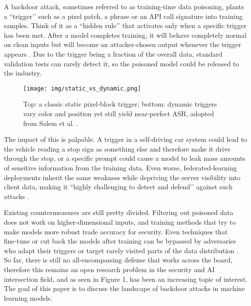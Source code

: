 \documentclass[sigconf,authorversion,nonacm,balance=false]{acmart}
\begin{document}
A backdoor attack, sometimes referred to as training‑time data poisoning, plants a “trigger’’ such as a pixel patch, a phrase or an API call signature into training samples. Think of it as a “hidden rule’’ that activates only when a specific trigger has been met. After a model completes training, it will behave completely normal on clean inputs but will become an attacker‑chosen output whenever the trigger appears \cite{attack_defense_wang_2023,background_attack_defense_goldblum_2023}. Due to the trigger being a fraction of the overall data, standard validation tests can rarely detect it, so the poisoned model could be released to the industry.

\begin{figure}[t]
  \centering
  \texttt{[image: img/static\_vs\_dynamic.png]}%
  \caption{Top: a classic static pixel‑block trigger; bottom: dynamic triggers vary color and position yet still yield near‑perfect ASR, adopted from Salem et al. \cite{attack_salem_2022}.}
  \label{fig:staticdynamic}
\end{figure}

The impact of this is palpable. A trigger in a self‑driving car system could lead to the vehicle reading a stop sign as something else and therefore make it drive through the stop, or a specific prompt could cause a model to leak mass amounts of sensitive information from the training data. Even worse, federated‑learning deployments inherit the same weakness while depriving the server visibility into client data, making it “highly challenging to detect and defend’’ against such attacks \cite{attack_salem_2022,casestudy_defense_gill_2023}.

Existing countermeasures are still pretty divided. Filtering out poisoned data does not work on higher‑dimensional inputs, and training methods that try to make models more robust trade accuracy for security. Even techniques that fine‑tune or cut back the models after training can be bypassed by adversaries who adapt their triggers or target rarely visited parts of the data distribution \cite{background_attack_defense_cina_2024}. So far, there is still no all‑encompassing defense that works across the board, therefore this remains an open research problem in the security and AI intersection field, and as seen in Figure 1, has been an increasing topic of interest.\\

The goal of this paper is to discuss the landscape of backdoor attacks in machine learning models.
\end{document}
